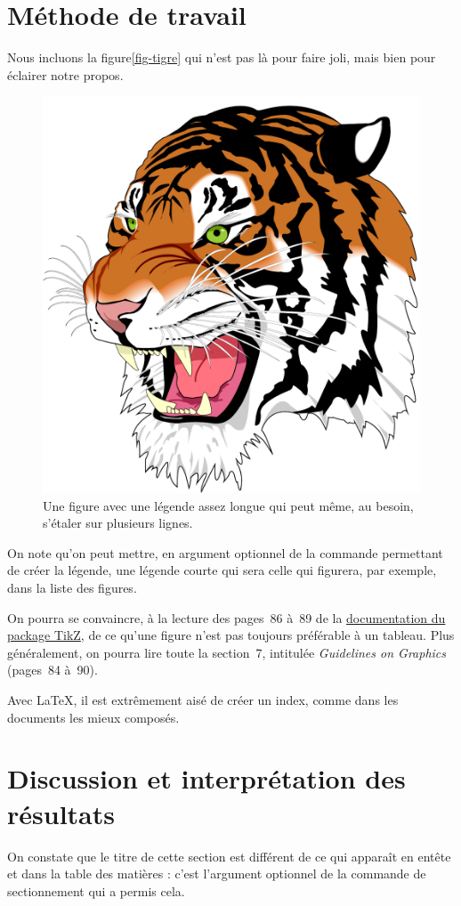 \documentclass[12pt,space=onehalf,version=final]{yathesis}
\newcommand{\package}[1]{\textsf{#1}}
\begin{document}
\lipsum[3-22]
%
\section{Méthode de travail}
\label{sec-methode}
%
Nous incluons la figure\vref{fig-tigre} qui n'est
pas là pour faire joli, mais bien pour éclairer notre propos.
\begin{figure}
  \centering
  \capstart
  \includegraphics[width=.35\linewidth]{tiger}
  \caption[Un tigre]{Une figure avec une légende assez longue qui peut
    même, au besoin, s'étaler sur plusieurs lignes.}
  \label{fig-tigre}
\end{figure}
On note qu'on peut mettre, en argument optionnel de la commande
permettant de créer la légende, une légende \og courte\fg{} qui sera
celle qui figurera, par exemple, dans la liste des figures.

On pourra se convaincre, à la lecture des pages~86 à~89 de la
\href{http://mirrors.ctan.org/graphics/pgf/base/doc/generic/pgf/pgfmanual.pdf}{documentation
  du package \package{TikZ}}, de ce qu'une figure
n'est pas toujours préférable à un tableau. Plus
généralement, on pourra lire toute la section~7, intitulée \emph{Guidelines on
  Graphics} (pages~84 à~90).

Avec \LaTeX{}, il est extrêmement aisé de créer
un index, comme dans les documents les mieux
composés.

\lipsum[23-42]
%
\section[Discussion]{Discussion et interprétation des résultats}
\label{sec-discussion}
%
On constate que le titre de cette section est différent de ce qui
apparaît en entête et dans la table des matières : c'est l'argument
optionnel de la commande de sectionnement qui a permis cela.

\lipsum[43-52]
%
\end{document}
